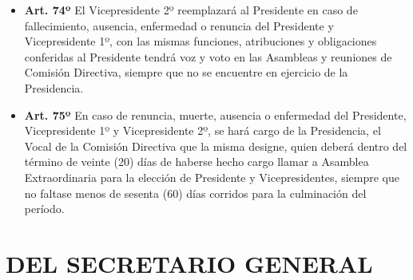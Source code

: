 \documentclass[openany]{book}
\providecommand{\tightlist}{%
  \setlength{\itemsep}{0pt}\setlength{\parskip}{0pt}}
\begin{document}
\begin{itemize}
\tightlist
\item
  \textbf{Art. 74º}
  El Vicepresidente 2º reemplazará al Presidente en caso de fallecimiento, ausencia, enfermedad o renuncia del Presidente y Vicepresidente 1º, con las mismas funciones, atribuciones y obligaciones conferidas al Presidente tendrá voz y voto en las Asambleas y reuniones de Comisión Directiva, siempre que no se encuentre en ejercicio de la Presidencia.
\end{itemize}

\begin{itemize}
\tightlist
\item
  \textbf{Art. 75º}
  En caso de renuncia, muerte, ausencia o enfermedad del Presidente, Vicepresidente 1º y Vicepresidente 2º, se hará cargo de la Presidencia, el Vocal de la Comisión Directiva que la misma designe, quien deberá dentro del término de veinte (20) días de haberse hecho cargo llamar a Asamblea Extraordinaria para la elección de Presidente y Vicepresidentes, siempre que no faltase menos de sesenta (60) días corridos para la culminación del período.
\end{itemize}

\hypertarget{cap11}{%
\chapter{DEL SECRETARIO GENERAL}\label{cap11}}
\end{document}

